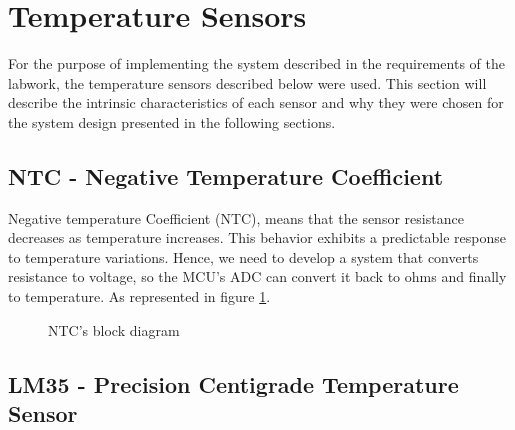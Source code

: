 \documentclass[12pt]{article}
\begin{document}
\pagebreak

\section{Temperature Sensors}
For the purpose of implementing the system described in the requirements of the labwork,
the temperature sensors described below were used. This section will describe the intrinsic
characteristics of each sensor and why they were chosen for the system design presented in the
following sections.
\subsection{NTC - Negative Temperature Coefficient}
    
    Negative temperature Coefficient (NTC), means that the sensor resistance decreases as temperature increases. This behavior exhibits a predictable response to temperature variations. Hence, we need to develop a system that converts resistance to voltage, so the MCU's ADC can convert it back to ohms and finally to temperature. As represented in figure \ref{fig:NTCBlock}.

    
    \begin{figure}[H]   
    \begin{centering}
        
        \caption{ NTC's block diagram }
        \label{fig:NTCBlock}

    \end{centering}
    \end{figure}

\subsection{LM35 - Precision Centigrade Temperature Sensor}
\end{document}
